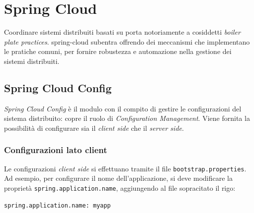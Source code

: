 
\chapter{Spring Cloud}\label{cap:spring-cloud}



\bigskip

Coordinare sistemi distribuiti basati su  porta notoriamente a cosiddetti \textit{boiler plate practices}. \gls{spring-cloud} subentra offrendo dei meccanismi che implementano le pratiche comuni, per fornire robustezza e automazione nella gestione dei sistemi distribuiti.

\clearpage


\section{Spring Cloud Config}

\textit{Spring Cloud Config} è il modulo con il compito di gestire le configurazioni del sistema distribuito: copre il ruolo di \textit{Configuration Management}.
Viene fornita la possibilità di configurare sia il \textit{client side} che il \textit{server side}.

\subsection{Configurazioni lato client} Le configurazioni \textit{client side} si effettuano tramite
il file \texttt{bootstrap.properties}. Ad esempio, per configurare il nome dell'applicazione, si deve
modificare la proprietà \texttt{spring.application.name}, aggiungendo al file sopracitato il rigo:

\begin{tcolorbox}
\texttt{spring.application.name: myapp}
\end{tcolorbox}

